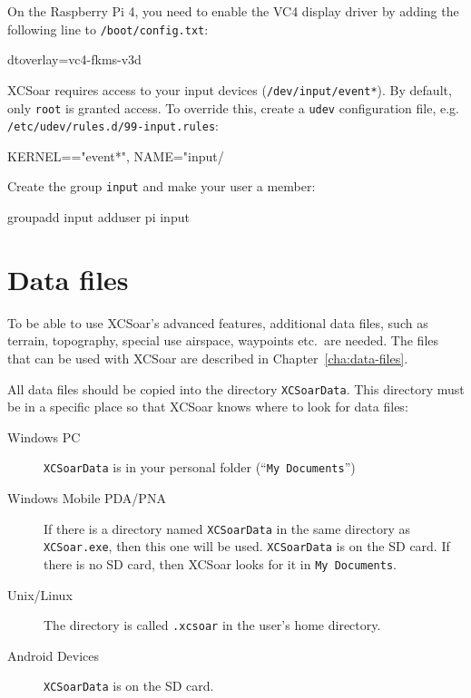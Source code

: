 On the Raspberry Pi 4, you need to enable the VC4 display driver by
adding the following line to \texttt{/boot/config.txt}:

\begin{verbatim*}
dtoverlay=vc4-fkms-v3d
\end{verbatim*}

XCSoar requires access to your input devices
(\texttt{/dev/input/event*}).  By default, only \texttt{root} is
granted access.  To override this, create a \texttt{udev}
configuration file, e.g. \texttt{/etc/udev/rules.d/99-input.rules}:

\begin{verbatim*}
KERNEL=="event*", NAME="input/%k", MODE="660", GROUP="input"
\end{verbatim*}

Create the group \texttt{input} and make your user a member:

\begin{verbatim*}
groupadd input
adduser pi input
\end{verbatim*}

\section{Data files}\label{sec:data files}

To be able to use XCSoar's advanced features, additional data files, such as
terrain, topography, special use airspace, waypoints etc.\ are needed. The files
that can be used with XCSoar are described in Chapter~\ref{cha:data-files}.

All data files should be copied into the directory
\texttt{XCSoarData}.  This directory must be in a specific place
so that XCSoar knows where to look for data files:

\begin{description}
\item[Windows PC]
\texttt{XCSoarData} is in your personal folder (``\texttt{My
Documents}'')
\item[Windows Mobile PDA/PNA]
If there is a directory named \texttt{XCSoarData} in the same
directory as \texttt{XCSoar.exe}, then this one will be used.
\texttt{XCSoarData} is on the SD card.  If there is no SD card, then
XCSoar looks for it in \texttt{My Documents}.
\item[Unix/Linux]
The directory is called \verb|.xcsoar| in the user's home directory.
\item[Android Devices]
\texttt{XCSoarData} is on the SD card.
\end{description}


